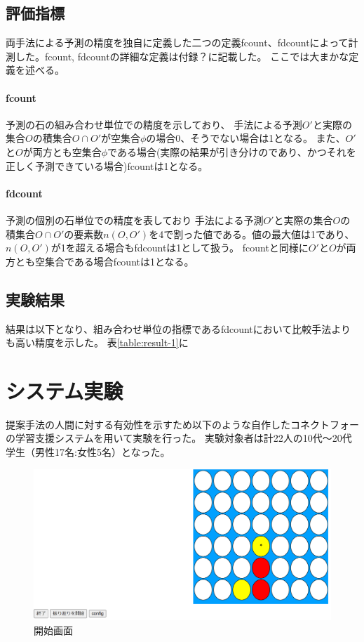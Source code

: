 \subsection{評価指標}
両手法による予測の精度を独自に定義した二つの定義fcount、fdcountによって計測した。fcount, fdcountの詳細な定義は付録？に記載した。
ここでは大まかな定義を述べる。
\paragraph{fcount}
予測の石の組み合わせ単位での精度を示しており、
手法による予測$O'$と実際の集合$O$の積集合$O\cap O'$が空集合$\phi$の場合0、そうでない場合は1となる。
また、$O'$と$O$が両方とも空集合$\phi$である場合(実際の結果が引き分けのであり、かつそれを正しく予測できている場合)fcountは1となる。
\paragraph{fdcount}
予測の個別の石単位での精度を表しており
手法による予測$O'$と実際の集合$O$の積集合$O\cap O'$の要素数$n(O, O')$を4で割った値である。値の最大値は1であり、$n(O, O')$が1を超える場合もfdcountは1として扱う。
fcountと同様に$O'$と$O$が両方とも空集合である場合fcountは1となる。
\subsection{実験結果}
結果は以下となり、組み合わせ単位の指標であるfdcountにおいて比較手法よりも高い精度を示した。
表\ref{table:result-1}に
\section{システム実験}
提案手法の人間に対する有効性を示すため以下のような自作したコネクトフォーの学習支援システムを用いて実験を行った。
実験対象者は計22人の10代～20代学生（男性17名:女性5名）となった。
\begin{figure}[t]
	\centering
	\includegraphics[width=\linewidth]{./figure/basicSystem.png}
	\caption{開始画面}
	\label{fig:basic}
\end{figure}

